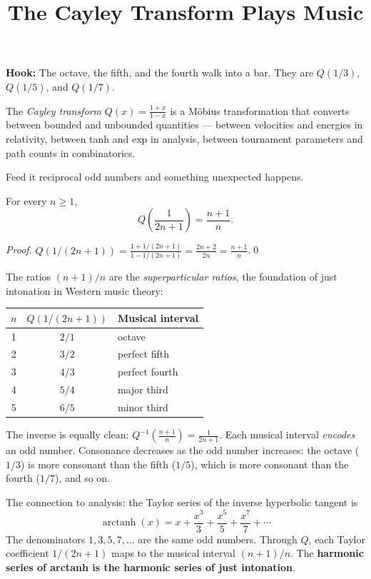 \documentclass[11pt]{article}
\title{The Cayley Transform Plays Music}
\author{}
\date{}
\begin{document}
\maketitle

\noindent\textbf{Hook:} The octave, the fifth, and the fourth walk into a bar.
They are $Q(1/3)$, $Q(1/5)$, and $Q(1/7)$.

\medskip

The \emph{Cayley transform} $Q(x) = \frac{1+x}{1-x}$ is a M\"obius transformation
that converts between bounded and unbounded quantities --- between velocities and
energies in relativity, between tanh and exp in analysis, between tournament parameters
and path counts in combinatorics.

Feed it reciprocal odd numbers and something unexpected happens.

\begin{theorem}
For every $n \geq 1$,
\[
Q\!\left(\frac{1}{2n+1}\right) = \frac{n+1}{n}.
\]
\end{theorem}

\begin{proof}
$Q(1/(2n+1)) = \frac{1 + 1/(2n+1)}{1 - 1/(2n+1)} = \frac{2n+2}{2n} = \frac{n+1}{n}$.\qed
\end{proof}

The ratios $(n+1)/n$ are the \emph{superparticular ratios}, the foundation of
just intonation in Western music theory:
\begin{center}
\begin{tabular}{ccl}
$n$ & $Q(1/(2n+1))$ & Musical interval \\
\hline
1 & $2/1$ & octave \\
2 & $3/2$ & perfect fifth \\
3 & $4/3$ & perfect fourth \\
4 & $5/4$ & major third \\
5 & $6/5$ & minor third \\
\end{tabular}
\end{center}

\noindent The inverse is equally clean: $Q^{-1}\!\left(\frac{n+1}{n}\right) = \frac{1}{2n+1}$.
Each musical interval \emph{encodes} an odd number. Consonance decreases as the
odd number increases: the octave ($1/3$) is more consonant than the fifth ($1/5$),
which is more consonant than the fourth ($1/7$), and so on.

The connection to analysis: the Taylor series of the inverse hyperbolic tangent is
\[
\operatorname{arctanh}(x) = x + \frac{x^3}{3} + \frac{x^5}{5} + \frac{x^7}{7} + \cdots
\]
The denominators $1, 3, 5, 7, \ldots$ are the same odd numbers. Through $Q$, each
Taylor coefficient $1/(2n+1)$ maps to the musical interval $(n+1)/n$. The
\textbf{harmonic series of arctanh is the harmonic series of just intonation}.
\end{document}
